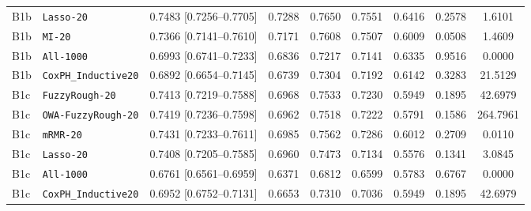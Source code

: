 \documentclass[10pt,twocolumn]{article}
\begin{document}
\begin{table}[t]
{\begin{tabular}{llccccccc}
B1b & \texttt{Lasso-20} & 0.7483 [0.7256--0.7705] & 0.7288 & 0.7650 & 0.7551 & 0.6416 & 0.2578
& 1.6101 \\
B1b & \texttt{MI-20} & 0.7366 [0.7141--0.7610] & 0.7171 & 0.7608 & 0.7507 & 0.6009 & 0.0508 &
1.4609 \\
B1b & \texttt{All-1000} & 0.6993 [0.6741--0.7233] & 0.6836 & 0.7217 & 0.7141 & 0.6335 & 0.9516
& 0.0000 \\
B1b & \texttt{CoxPH\_Inductive20} & 0.6892 [0.6654--0.7145] & 0.6739 & 0.7304 & 0.7192 & 0.6142
& 0.3283 & 21.5129 \\
B1c & \texttt{FuzzyRough-20} & 0.7413 [0.7219--0.7588] & 0.6968 & 0.7533 & 0.7230 & 0.5949 &
0.1895 & 42.6979 \\
B1c & \texttt{OWA-FuzzyRough-20} & 0.7419 [0.7236--0.7598] & 0.6962 & 0.7518 & 0.7222 & 0.5791
& 0.1586 & 264.7961 \\
B1c & \texttt{mRMR-20} & 0.7431 [0.7233--0.7611] & 0.6985 & 0.7562 & 0.7286 & 0.6012 & 0.2709 &
0.0110 \\
B1c & \texttt{Lasso-20} & 0.7408 [0.7205--0.7585] & 0.6960 & 0.7473 & 0.7134 & 0.5576 & 0.1341
& 3.0845 \\
B1c & \texttt{All-1000} & 0.6761 [0.6561--0.6959] & 0.6371 & 0.6812 & 0.6599 & 0.5783 & 0.6767
& 0.0000 \\
B1c & \texttt{CoxPH\_Inductive20} & 0.6952 [0.6752--0.7131] & 0.6653 & 0.7310 & 0.7036 & 0.5949
& 0.1895 & 42.6979 \\
\bottomrule
\end{tabular}}
\end{table}

\FloatBarrier

{\raggedright
\small


}
\end{document}
